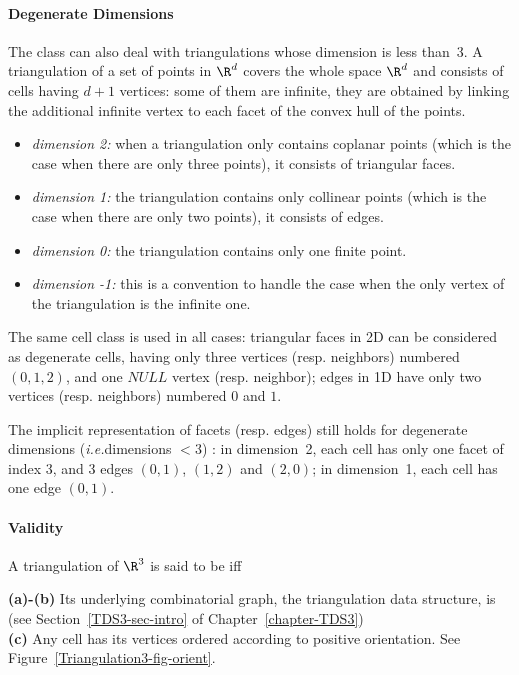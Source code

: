 \paragraph{Degenerate Dimensions}
The class  can also deal with
triangulations whose dimension is less than~3. A triangulation of a
set of points in $\R^d$ covers the whole space $\R^d$ and consists of
cells having $d+1$ vertices: some of them are infinite, they are
obtained by linking the additional infinite vertex to each facet of
the convex hull of the points.
\begin{itemize}
\item {} \emph{dimension 2:} when a triangulation only contains
coplanar points (which is the case when there are only three points), 
it consists of triangular faces.
\item {} \emph{dimension 1:} the triangulation contains only collinear 
points (which is the case when there are only two points), it consists
of edges.
\item {} \emph{dimension 0:} the triangulation contains only one
finite point.
\item {} \emph{dimension -1:} this is a convention to handle the case
when the only vertex of the triangulation is the infinite one.
\end{itemize} 

The same cell class is used in all cases: triangular faces in
2D can be considered as degenerate cells, having only three vertices
(resp. neighbors)
numbered $(0,1,2)$, and one $NULL$ vertex (resp. neighbor);
edges in 1D have only two vertices (resp. neighbors) numbered $0$ and $1$. 

The implicit representation of facets (resp. edges) still holds
for degenerate dimensions (\textit{i.e.}dimensions $<3$) : in
dimension~2, each cell has only one facet of index 3, and 3 edges
$(0,1)$, $(1,2)$ and $(2,0)$; in dimension~1, each cell has one edge
$(0,1)$.  

\paragraph{Validity}
A triangulation of $\R^3$ is said to be  iff

{\bf (a)-(b)} Its underlying combinatorial graph, the triangulation
data structure, is  
(see Section~\ref{TDS3-sec-intro} of Chapter~\ref{chapter-TDS3})\\
{\bf (c)} Any cell has its vertices ordered according to positive
orientation. See Figure~\ref{Triangulation3-fig-orient}.

